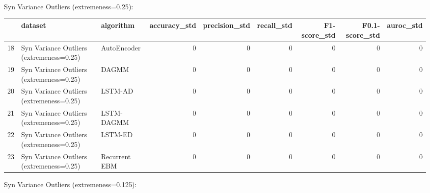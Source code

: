 Syn Variance Outliers (extremeness=0.25):

\begin{tabular}{rllrrrrrr}
\hline
    & dataset                                  & algorithm     &   accuracy\_std &   precision\_std &   recall\_std &   F1-score\_std &   F0.1-score\_std &   auroc\_std \\
\hline
 18 & Syn Variance Outliers (extremeness=0.25) & AutoEncoder   &              0 &               0 &            0 &              0 &                0 &           0 \\
 19 & Syn Variance Outliers (extremeness=0.25) & DAGMM         &              0 &               0 &            0 &              0 &                0 &           0 \\
 20 & Syn Variance Outliers (extremeness=0.25) & LSTM-AD       &              0 &               0 &            0 &              0 &                0 &           0 \\
 21 & Syn Variance Outliers (extremeness=0.25) & LSTM-DAGMM    &              0 &               0 &            0 &              0 &                0 &           0 \\
 22 & Syn Variance Outliers (extremeness=0.25) & LSTM-ED       &              0 &               0 &            0 &              0 &                0 &           0 \\
 23 & Syn Variance Outliers (extremeness=0.25) & Recurrent EBM &              0 &               0 &            0 &              0 &                0 &           0 \\
\hline
\end{tabular}

Syn Variance Outliers (extremeness=0.125):

